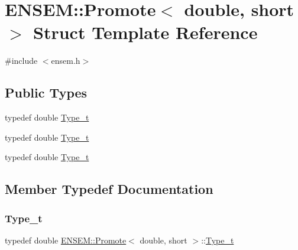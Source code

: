 \hypertarget{structENSEM_1_1Promote_3_01double_00_01short_01_4}{}\section{E\+N\+S\+EM\+:\+:Promote$<$ double, short $>$ Struct Template Reference}
\label{structENSEM_1_1Promote_3_01double_00_01short_01_4}


{\ttfamily \#include $<$ensem.\+h$>$}

\subsection*{Public Types}
\begin{DoxyCompactItemize}
\item 
typedef double \mbox{\hyperlink{structENSEM_1_1Promote_3_01double_00_01short_01_4_add06e396481b481fe69ed962df8e530a}{Type\+\_\+t}}
\item 
typedef double \mbox{\hyperlink{structENSEM_1_1Promote_3_01double_00_01short_01_4_add06e396481b481fe69ed962df8e530a}{Type\+\_\+t}}
\item 
typedef double \mbox{\hyperlink{structENSEM_1_1Promote_3_01double_00_01short_01_4_add06e396481b481fe69ed962df8e530a}{Type\+\_\+t}}
\end{DoxyCompactItemize}


\subsection{Member Typedef Documentation}
\mbox{\label{structENSEM_1_1Promote_3_01double_00_01short_01_4_add06e396481b481fe69ed962df8e530a}} 
\subsubsection{\texorpdfstring{Type\_t}{Type\_t}\hspace{0.1cm}{\footnotesize\ttfamily [1/3]}}
{\footnotesize\ttfamily typedef double \mbox{\hyperlink{structENSEM_1_1Promote}{E\+N\+S\+E\+M\+::\+Promote}}$<$ double, short $>$\+::\mbox{\hyperlink{structENSEM_1_1Promote_3_01double_00_01short_01_4_add06e396481b481fe69ed962df8e530a}{Type\+\_\+t}}}

